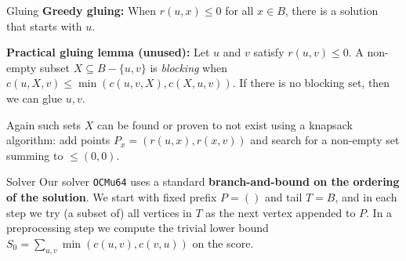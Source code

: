 \documentclass[final]{beamer}
\newlength{\colwidth}
\theoremstyle{remark}
\begin{document}
\begin{frame}[t]
\begin{columns}[t]
\begin{column}{\colwidth}
\begin{block}{Gluing}
        \textbf{Greedy gluing:}
        When $r(u, x)\leq 0$ for all $x\in B$, there is a solution that
        starts with $u$.

        \textbf{Practical gluing lemma (unused):}
        Let $u$ and $v$ satisfy $r(u, v) \leq 0$.
        A non-empty subset $X\subseteq B-\{u,v\}$ is \emph{blocking} when $c(u, X, v) \leq
        \min(c(u, v, X), c(X, u, v))$. If there is no blocking set, then we can glue $u, v$.

        Again such sets $X$ can be found or proven to not exist using a knapsack
        algorithm: add points $P_x = (r(u, x), r(x, v))$ and search for a non-empty
        set summing to $\leq{}(0,0)$.
      \end{block}

      \begin{block}{Solver}
        Our solver \texttt{OCMu64} uses a standard \textbf{branch-and-bound on the ordering of the
        solution}.  We start with fixed prefix $P=()$ and tail $T=B$, and in each step we try (a
        subset of) all vertices in $T$ as the next vertex appended to $P$.
        In a preprocessing step we compute the trivial lower bound $S_0 =
        \sum_{u,v}\min(c(u,v),c(v,u))$ on the score.


\end{block}
\end{column}
\end{columns}
\end{frame}
\end{document}
